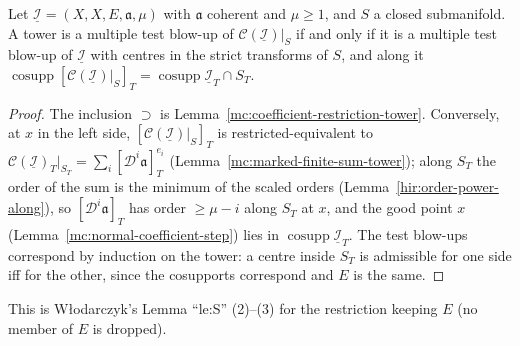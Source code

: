 \begin{lemma}
\label{mc:coefficient-restriction-full}
\leanok
Let \(\underline{\mathcal I}=(X,X,E,\mathfrak a,\mu)\) with \(\mathfrak a\) coherent and \(\mu\ge1\), and \(S\) a closed submanifold. A tower is a multiple test blow-up of
\(\mathcal C(\underline{\mathcal I})|_S\) if and only if it is a multiple test blow-up of \(\underline{\mathcal I}\) with centres in the strict transforms of \(S\), and along it
\(\operatorname{cosupp}[\mathcal C(\underline{\mathcal I})|_S]_T=\operatorname{cosupp}\underline{\mathcal I}_T\cap S_T\).
\end{lemma}
\begin{proof}
\leanok
The inclusion \(\supset\) is Lemma~\ref{mc:coefficient-restriction-tower}. Conversely, at \(x\) in the left side, \([\mathcal C(\underline{\mathcal I})|_S]_T\) is restricted-equivalent
to \(\mathcal C(\underline{\mathcal I})_T|_{S_T}=\sum_i[\mathcal D^i\mathfrak a]_T^{e_i}\) (Lemma~\ref{mc:marked-finite-sum-tower}); along \(S_T\) the order of the sum is the minimum of the
scaled orders (Lemma~\ref{hir:order-power-along}), so \([\mathcal D^i\mathfrak a]_T\) has order \(\ge\mu-i\) along \(S_T\) at \(x\), and the good point \(x\)
(Lemma~\ref{mc:normal-coefficient-step}) lies in \(\operatorname{cosupp}\underline{\mathcal I}_T\). The test blow-ups correspond by induction on the tower: a centre inside \(S_T\) is admissible
for one side iff for the other, since the cosupports correspond and \(E\) is the same.
\end{proof}
This is Włodarczyk's Lemma ``le:S'' (2)--(3) for the restriction keeping \(E\) (no member of \(E\) is dropped).

